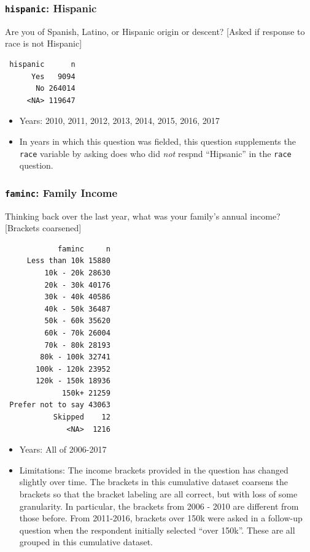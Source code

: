 \documentclass[10pt,article,oneside]{memoir}
\theoremstyle{definition}
\begin{document}
\subsubsection{\texorpdfstring{\texttt{hispanic}:
Hispanic}{hispanic: Hispanic}}\label{hispanic-hispanic}

Are you of Spanish, Latino, or Hispanic origin or descent? {[}Asked if
response to race is not Hispanic{]}

\begin{verbatim}
 hispanic      n
      Yes   9094
       No 264014
     <NA> 119647
\end{verbatim}

\begin{itemize}
\tightlist
\item
  Years: 2010, 2011, 2012, 2013, 2014, 2015, 2016, 2017
\item
  In years in which this question was fielded, this question supplements
  the \texttt{race} variable by asking does who did \emph{not} respnd
  ``Hipsanic'' in the \texttt{race} question.
\end{itemize}

\subsubsection{\texorpdfstring{\texttt{faminc}: Family
Income}{faminc: Family Income}}\label{faminc-family-income}

Thinking back over the last year, what was your family's annual income?
{[}Brackets coarsened{]}

\begin{verbatim}
            faminc     n
     Less than 10k 15880
         10k - 20k 28630
         20k - 30k 40176
         30k - 40k 40586
         40k - 50k 36487
         50k - 60k 35620
         60k - 70k 26004
         70k - 80k 28193
        80k - 100k 32741
       100k - 120k 23952
       120k - 150k 18936
             150k+ 21259
 Prefer not to say 43063
           Skipped    12
              <NA>  1216
\end{verbatim}

\begin{itemize}
\tightlist
\item
  Years: All of 2006-2017
\item
  Limitations: The income brackets provided in the question has changed
  slightly over time. The brackets in this cumulative dataset coarsens
  the brackets so that the bracket labeling are all correct, but with
  loss of some granularity. In particular, the brackets from 2006 - 2010
  are different from those before. From 2011-2016, brackets over 150k
  were asked in a follow-up question when the respondent initially
  selected ``over 150k''. These are all grouped in this cumulative
  dataset.
\end{itemize}
\end{document}
